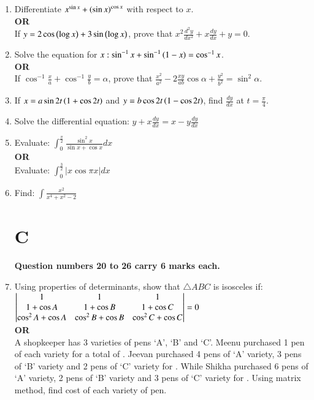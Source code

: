 \documentclass[journal,12pt,onecolumn]{IEEEtran}
\theoremstyle{remark}
\begin{document}
\begin{enumerate}
	\item Differentiate $x^{\sin{x}} + \left(\sin{x}\right)^{\cos{x}}$ with respect to $x$.\\
	\textbf{OR}\\
	If $y = 2\cos{\ensuremath{\left(\log{x}\right)}} + 3\sin{\ensuremath{\left(\log{x}\right)}}$, prove that $x^2\frac{d^2y}{dx^2} + x\frac{dy}{dx} + y = 0$.\\
	
	\item Solve the equation for $x : \sin^{-1}{x} + \sin^{-1}{\left(1-x\right)} = \cos^{-1}{x}$.\\
	\textbf{OR}\\
	If $ \cos^{-1}{\frac{x}{a}} + \cos^{-1}{\frac{y}{b}} = \alpha$, prove that $ \frac{x^2}{a^2} - 2\frac{xy}{ab}\cos{\alpha} + \frac{y^2}{b^2} = \sin^2{\alpha}$.\\
	
	\item If $x = a\sin{2t}\left(1 + \cos{2t}\right)$ and $y = b\cos{2t}\left(1 - \cos{2t}\right)$, find $ \frac{dy}{dx}$ at $t = \frac{\pi}{4}$.\\
	
	\item Solve the differential equation: $y + x\frac{dy}{dx} = x - y\frac{dy}{dx}$\\
	
	\item Evaluate: $ \int^{\frac{\pi}{2}}_0{\frac{\sin^2{x}}{\sin{x} + \cos{x}}dx}$\\
	\textbf{OR}\\
	Evaluate: $\int^{\frac{3}{2}}_0{|x\cos{\pi x}|dx}$\\
	
	\item Find: $\int{\frac{x^2}{x^4 + x^2 -2}}$\\
	
\section{\textbf{C}}
\textbf{Question numbers 20 to 26 carry 6 marks each.}\\

	\item Using properties of determinants, show that $\triangle{ABC}$ is isosceles if:\\
	$\begin{vmatrix}1 & 1 & 1 \\ 1 + \cos{A} & 1 + \cos{B} & 1 + \cos{C} \\ \cos^2{A} + \cos{A} & \cos^2{B} + \cos{B} & \cos^2{C} + \cos{C} \end{vmatrix} = 0$\\
	\textbf{OR}\\
	A shopkeeper has 3 varieties of pens `A', `B' and `C'. Meenu purchased 1 pen of each variety for a total of . Jeevan purchased 4 pens of `A' variety, 3 pens of `B' variety and 2 pens of `C' variety for . While Shikha purchased 6 pens of `A' variety, 2 pens of `B' variety and 3 pens of `C' variety for . Using matrix method, find cost of each variety of pen.\\
	

\end{enumerate}
\end{document}
